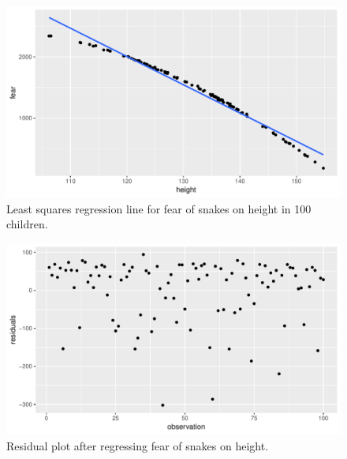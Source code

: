 \documentclass[]{report}\usepackage[]{graphicx}\usepackage[]{color}
\makeatletter
\def\maxwidth{ %
  \ifdim\Gin@nat@width>\linewidth
    \linewidth
  \else
    \Gin@nat@width
  \fi
}
\newenvironment{knitrout}{}{} %
\makeatother
\begin{document}
\begin{knitrout}
\color{fgcolor}\begin{figure}

{\centering \includegraphics[width=\maxwidth]{figure/ass_10-1} 

}

\caption[Least squares regression line for fear of snakes on height in 100 children]{Least squares regression line for fear of snakes on height in 100 children.}\label{fig:ass_10}
\end{figure}


\end{knitrout}

\begin{knitrout}
\color{fgcolor}\begin{figure}

{\centering \includegraphics[width=\maxwidth]{figure/ass_11-1} 

}

\caption[Residual plot after regressing fear of snakes on height]{Residual plot after regressing fear of snakes on height.}\label{fig:ass_11}
\end{figure}


\end{knitrout}
\end{document}
